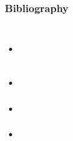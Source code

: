 \begin{frame}[allowframebreaks]
\frametitle{Bibliography}

\end{frame}

\begin{frame}[fragile]
\frametitle{}
\pause
\begin{itemize}[<+->]
\end{itemize}
\end{frame}
\begin{frame}[fragile]
\frametitle{}
\pause
\begin{verbatim}
\end{verbatim}
\end{frame}
\begin{frame}[fragile]
\frametitle{}
\pause
\begin{itemize}[<+->]
\item 
\end{itemize}
\end{frame}
\pause
\begin{description}
\end{description}
\begin{verbatim}
\end{verbatim}
\begin{frame}[fragile]
\frametitle{}
\pause
\begin{itemize}[<+->]
\item 
\end{itemize}
\end{frame}
\begin{frame}[fragile]
\frametitle{}
\pause
\end{frame}
\begin{frame}[fragile]
\frametitle{}
\pause
\begin{itemize}[<+->]
\item 
\end{itemize}
\end{frame}
\begin{frame}[fragile]
\frametitle{}
\pause
\begin{itemize}[<+->]
\item 
\end{itemize}
\end{frame}
